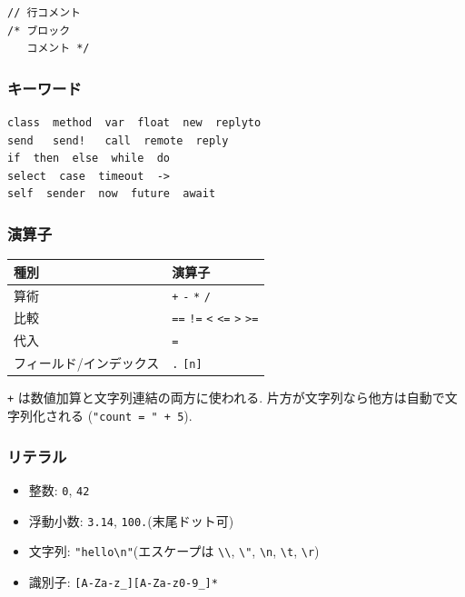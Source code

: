 \documentclass[11pt,a4paper]{article}
\begin{document}
\begin{lstlisting}
// 行コメント
/* ブロック
   コメント */
\end{lstlisting}

\subsubsection*{キーワード}

\begin{lstlisting}
class  method  var  float  new  replyto
send   send!   call  remote  reply
if  then  else  while  do
select  case  timeout  ->
self  sender  now  future  await
\end{lstlisting}

\subsubsection*{演算子}

\begin{center}
\begin{tabular}{ll}
\toprule
種別 & 演算子 \\
\midrule
算術 & \texttt{+} \texttt{-} \texttt{*} \texttt{/} \\
比較 & \texttt{==} \texttt{!=} \texttt{<} \texttt{<=} \texttt{>} \texttt{>=} \\
代入 & \texttt{=} \\
フィールド/インデックス & \texttt{.} \texttt{[n]} \\
\bottomrule
\end{tabular}
\end{center}

\texttt{+} は数値加算と文字列連結の両方に使われる.
片方が文字列なら他方は自動で文字列化される (\texttt{"count = " + 5}).

\subsubsection*{リテラル}

\begin{itemize}
  \item 整数: \texttt{0}, \texttt{42}
  \item 浮動小数: \texttt{3.14}, \texttt{100.}(末尾ドット可)
  \item 文字列: \texttt{"hello{\textbackslash}n"}(エスケープは \texttt{{\textbackslash}{\textbackslash}}, \texttt{{\textbackslash}"}, \texttt{{\textbackslash}n}, \texttt{{\textbackslash}t}, \texttt{{\textbackslash}r})
  \item 識別子: \texttt{[A-Za-z\_][A-Za-z0-9\_]*}
\end{itemize}
\end{document}
